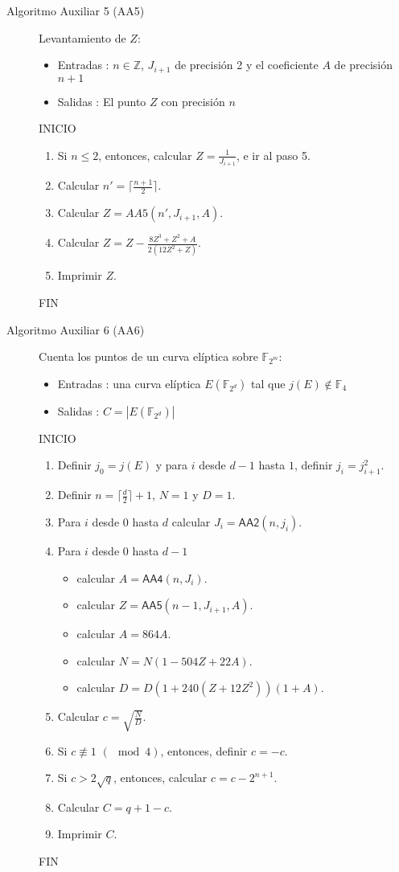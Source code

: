 \documentclass[11pt]{article}
\newcommand{\Z}{\mathbb{Z}}
\newcommand{\F}{\mathbb{F}}
\newcommand{\Fm}{\F_{2^m}}
\numberwithin{equation}{section} %
\numberwithin{figure}{section} %
\numberwithin{table}{section} %
\begin{document}
\begin{description}
			\item[Algoritmo Auxiliar 5 (AA5)] Levantamiento de $Z$:%
			\begin{itemize}
				\item Entradas : $n\in\Z$, $J_{i+1}$ de precisión 2 y el coeficiente $A$ de precisión $n+1$
				\item Salidas : El punto $Z$ con precisión $n$ 
			\end{itemize}
			INICIO
			\begin{enumerate}
				\item Si $n\leq 2$, entonces, calcular $Z=\frac{1}{J_{i+1}}$, e ir al paso 5. 
				\item Calcular $n\prime = \lceil\frac{n+1}{2}\rceil$.
				\item Calcular $Z=AA5(n\prime,J_{i+1},A)$.
				\item Calcular $Z=Z-\frac{8Z^3+Z^2+A}{2(12Z^2+Z)}$.
				\item Imprimir $Z$. 
			\end{enumerate}
			FIN

			\item[Algoritmo Auxiliar 6 (AA6)] Cuenta los puntos de un curva elíptica sobre $\Fm$:%
			\begin{itemize}
				\item Entradas : una curva elíptica $E(\F_{2^d})$ tal que $j(E)\not\in\F_4$ 
				\item Salidas : $C=|E(\F_{2^d})|$
			\end{itemize}
			INICIO
			\begin{enumerate}
				\item Definir $j_0=j(E)$ y para $i$ desde $d-1$ hasta $1$, definir $j_i=j^2_{i+1}$.
				\item Definir $n=\lceil\frac{d}{2}\rceil+1$, $N=1$ y $D=1$.
				\item Para $i$ desde $0$ hasta $d$ calcular $J_i=\textsf{AA2}(n,j_i)$.
				\item Para $i$ desde $0$ hasta $d-1$
				\begin{itemize}
					\item calcular $A=\textsf{AA4}(n,J_i)$.
					\item calcular $Z=\textsf{AA5}(n-1,J_{i+1},A)$.
					\item calcular $A=864A$.
					\item calcular $N=N(1-504Z+22A)$.
					\item calcular $D=D(1+240(Z+12Z^2))(1+A)$.
				\end{itemize}
				\item Calcular $c=\sqrt{\frac{N}{D}}$.
				\item Si $c\not\equiv 1$ $(\mod 4)$, entonces, definir $c=-c$.
				\item Si $c>2\sqrt{q}$, entonces, calcular $c=c-2^{n+1}$.
				\item Calcular $C=q+1-c$.
				\item Imprimir $C$.  
			\end{enumerate}
			FIN

\end{description}%
\end{document}
